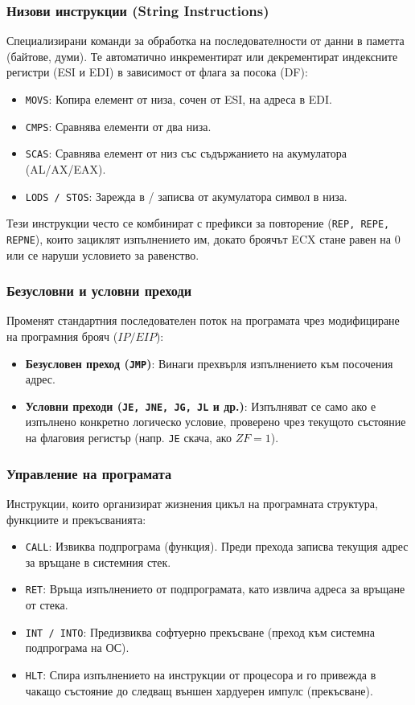 \documentclass{scrartcl}
\begin{document}
\begin{FlushLeft}
\subsubsection{Низови инструкции (String Instructions)}
Специализирани команди за обработка на последователности от данни в паметта (байтове, думи). Те автоматично инкрементират или декрементират индексните регистри (ESI и EDI) в зависимост от флага за посока (DF):
\begin{itemize}
    \item \texttt{MOVS}: Копира елемент от низа, сочен от ESI, на адреса в EDI.
    \item \texttt{CMPS}: Сравнява елементи от два низа.
    \item \texttt{SCAS}: Сравнява елемент от низ със съдържанието на акумулатора (AL/AX/EAX).
    \item \texttt{LODS / STOS}: Зарежда в / записва от акумулатора символ в низа.
\end{itemize}
Тези инструкции често се комбинират с префикси за повторение (\texttt{REP, REPE, REPNE}), които зациклят изпълнението им, докато броячът ECX стане равен на 0 или се наруши условието за равенство.

\subsubsection{Безусловни и условни преходи} 
Променят стандартния последователен поток на програмата чрез модифициране на програмния брояч ($IP / EIP$):
\begin{itemize}
    \item \textbf{Безусловен преход (\texttt{JMP})}: Винаги прехвърля изпълнението към посочения адрес.
    \item \textbf{Условни преходи (\texttt{JE, JNE, JG, JL} и др.)}: Изпълняват се само ако е изпълнено конкретно логическо условие, проверено чрез текущото състояние на флаговия регистър (напр. \texttt{JE} скача, ако $ZF = 1$).
\end{itemize}

\subsubsection{Управление на програмата}
Инструкции, които организират жизнения цикъл на програмната структура, функциите и прекъсванията:
\begin{itemize}
    \item \texttt{CALL}: Извиква подпрограма (функция). Преди прехода записва текущия адрес за връщане в системния стек.
    \item \texttt{RET}: Връща изпълнението от подпрограмата, като извлича адреса за връщане от стека.
    \item \texttt{INT / INTO}: Предизвиква софтуерно прекъсване (преход към системна подпрограма на ОС).
    \item \texttt{HLT}: Спира изпълнението на инструкции от процесора и го привежда в чакащо състояние до следващ външен хардуерен импулс (прекъсване).
\end{itemize}

\end{FlushLeft}
\end{document}
